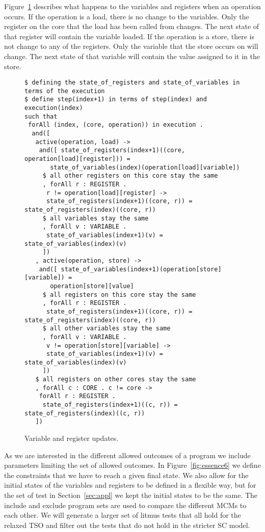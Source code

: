 \documentclass[runningheads]{llncs}
\begin{document}
Figure~\ref{fig:essence-step2} describes what happens to the variables and registers when an operation occurs.
If the operation is a load, there is no change to the variables.
Only the register on the core that the load has been called from changes.
The next state of that register will contain the variable loaded.
If the operation is a store, there is not change to any of the registers.
Only the variable that the store occurs on will change.
The next state of that variable will contain the value assigned to it in the store.

\begin{figure}
\begin{lstlisting}
$ defining the state_of_registers and state_of_variables in terms of the execution
$ define step(index+1) in terms of step(index) and execution(index)
such that
 forAll (index, (core, operation)) in execution .
  and([
   active(operation, load) ->
    and([ state_of_registers(index+1)((core, operation[load][register])) =
       state_of_variables(index)(operation[load][variable])
     $ all other registers on this core stay the same
     , forAll r : REGISTER .
      r != operation[load][register] ->
      state_of_registers(index+1)((core, r)) = state_of_registers(index)((core, r))
     $ all variables stay the same
     , forAll v : VARIABLE .
      state_of_variables(index+1)(v) = state_of_variables(index)(v)
     ])
   , active(operation, store) ->
    and([ state_of_variables(index+1)(operation[store][variable]) =
       operation[store][value]
     $ all registers on this core stay the same
     , forAll r : REGISTER .
      state_of_registers(index+1)((core, r)) = state_of_registers(index)((core, r))
     $ all other variables stay the same
     , forAll v : VARIABLE .
      v != operation[store][variable] ->
      state_of_variables(index+1)(v) = state_of_variables(index)(v)
     ])
   $ all registers on other cores stay the same
   , forAll c : CORE . c != core ->
    forAll r : REGISTER .
     state_of_registers(index+1)((c, r)) = state_of_registers(index)((c, r))
   ])
\end{lstlisting}
\caption{Variable and register updates. \label{fig:essence-step2}}
\end{figure}


As we are interested in the different allowed outcomes of a program we include parameters limiting the set of allowed outcomes.
In Figure~\ref{fig:essence6} we define the constraints that we have to reach a given final state.
We also allow for the initial states of the variables and registers to be defined in a flexible way, but for the set of test in Section~\ref{sec:appl} we kept the initial states to be the same.
The include and exclude program sets are used to compare the different MCMs to each other.
We will generate a larger set of litmus tests that all hold for the relaxed TSO and filter out the tests that do not hold in the stricter SC model.
\end{document}
